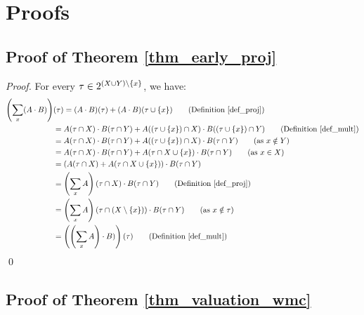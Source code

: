 




\section{Proofs}
\label{sec_proofs}


\subsection{Proof of Theorem \ref{thm_early_proj}}

\begin{proof}
    For every $\tau \in 2^{(X \cup Y) \setminus \left\{ x \right\}}$, we have:
    \begin{align*}
      \pars{\proj_x (A \mult B)} &(\tau)
       = (A \mult B)(\tau) + (A \mult B)(\tau \cup \set{x})
        \tag{Definition \ref{def_proj}} \\
      & = A(\tau \cap X) \mult B(\tau \cap Y)+ A((\tau \cup \set{x}) \cap X) \mult B((\tau \cup \set{x}) \cap Y)
        \tag{Definition \ref{def_mult}} \\
      & = A(\tau \cap X) \mult B(\tau \cap Y)+ A((\tau \cup \set{x}) \cap X) \mult B(\tau \cap Y)
        \tag{as $x \notin Y$} \\
      & = A(\tau \cap X) \mult B(\tau \cap Y)+ A(\tau \cap X \cup \set{x}) \mult B(\tau \cap Y)
        \tag{as $x \in X$} \\
      & = (A(\tau \cap X) + A(\tau \cap X \cup \set{x})) \mult B(\tau \cap Y) \\
      & = \pars{\proj_x A}(\tau \cap X) \mult B(\tau \cap Y)
        \tag{Definition \ref{def_proj}} \\
      & = \pars{\proj_x A}(\tau \cap (X \setminus \set{x})) \mult B(\tau \cap Y)
        \tag{as $x \notin \tau$} \\
      & = \pars{\pars{\proj_x A} \mult B)}(\tau)
        \tag{Definition \ref{def_mult}}
    \end{align*}
\qed
\end{proof}


\subsection{Proof of Theorem \ref{thm_valuation_wmc}}

